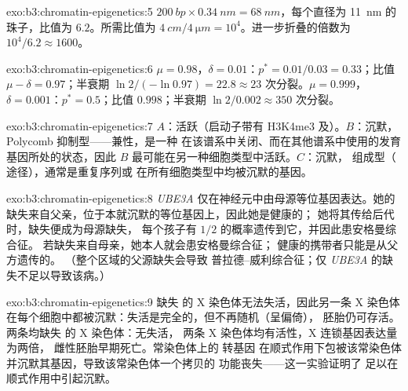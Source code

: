\begin{solution}{exo:b3:chromatin-epigenetics:5}
$\qty{200}{bp}\times \qty{0.34}{nm} = \qty{68}{nm}$，每个直径为
\qty{11}{nm} 的珠子，比值为 $6.2$。所需比值为 $\qty{4}{cm}/\qty{4}{\micro m} =
10^{4}$。进一步折叠的倍数为 $10^{4}/6.2 \approx 1600$。
\end{solution}

\begin{solution}{exo:b3:chromatin-epigenetics:6}
$\mu = 0.98$，$\delta = 0.01$：$p^{*} = 0.01/0.03 = 0.33$；比值 $\mu -
\delta = 0.97$；半衰期 $\ln 2/(-\ln 0.97) = 22.8 \approx 23$
次分裂。$\mu = 0.999$，$\delta = 0.001$：$p^{*} = 0.5$；比值
$0.998$；半衰期 $\ln 2 / 0.002 \approx 350$ 次分裂。
\end{solution}

\begin{solution}{exo:b3:chromatin-epigenetics:7}
$A$：活跃（启动子带有 H3K4me3 及）。$B$：沉默，
Polycomb 抑制型——兼性，是一种
在该谱系中关闭、而在其他谱系中使用的发育基因所处的状态，因此
$B$ 最可能在另一种细胞类型中活跃。$C$：沉默，
组成型（ 途径），通常是重复序列或
在所有细胞类型中均被沉默的基因。
\end{solution}

\begin{solution}{exo:b3:chromatin-epigenetics:8}
\emph{UBE3A} 仅在神经元中由母源等位基因表达。她的
缺失来自父亲，位于本就沉默的等位基因上，因此她是健康的；
她将其传给后代时，缺失便成为母源缺失，
每个孩子有 $1/2$ 的概率遗传到它，并因此患安格曼综合征。
若缺失来自母亲，她本人就会患安格曼综合征；
健康的携带者只能是从父方遗传的。
（整个区域的父源缺失会导致
普拉德–威利综合征；仅 \emph{UBE3A} 的缺失不足以导致该病。）
\end{solution}

\begin{solution}{exo:b3:chromatin-epigenetics:9}
缺失 \emph{} 的 X 染色体无法失活，因此另一条 X 染色体
在每个细胞中都被沉默：失活是完全的，但不再随机（呈偏倚），
胚胎仍可存活。两条均缺失 \emph{} 的 X 染色体：无失活，
两条 X 染色体均有活性，X 连锁基因表达量为两倍，
雌性胚胎早期死亡。常染色体上的 \emph{} 转基因
在顺式作用下包被该常染色体并沉默其基因，导致该常染色体一个拷贝的
功能丧失——这一实验证明了
\emph{} 足以在顺式作用中引起沉默。
\end{solution}


